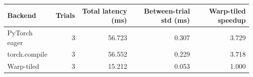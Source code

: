 \begin{tabular}{lrrrr}
\toprule
Backend & Trials & Total latency (ms) & Between-trial std (ms) & Warp-tiled speedup \\
\midrule
PyTorch eager & 3 & 56.723 & 0.307 & 3.729 \\
torch.compile & 3 & 56.552 & 0.229 & 3.718 \\
Warp-tiled & 3 & 15.212 & 0.053 & 1.000 \\
\bottomrule
\end{tabular}
